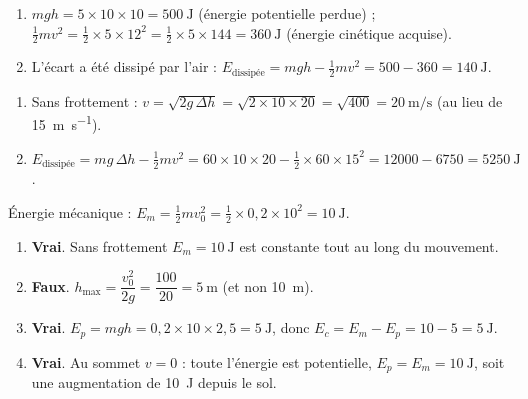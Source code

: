 \documentclass[11pt,a4paper]{article}
\begin{document}

\begin{corrige}
\begin{enumerate}[label=\alph*)]
  \item $mgh=5\times10\times10=\qty{500}{\joule}$ (énergie potentielle perdue) ;
        $\tfrac12 m v^2=\tfrac12\times5\times12^2=\tfrac12\times5\times144=\qty{360}{\joule}$
        (énergie cinétique acquise).
  \item L'écart a été dissipé par l'air :
        $E_{\text{dissipée}}=mgh-\tfrac12 m v^2=500-360=\qty{140}{\joule}$.
\end{enumerate}
\end{corrige}

\begin{corrige}
\begin{enumerate}[label=\alph*)]
  \item Sans frottement : $v=\sqrt{2g\,\Delta h}=\sqrt{2\times10\times20}=\sqrt{400}=\qty{20}{\metre\per\second}$
        (au lieu de \qty{15}{\metre\per\second}).
  \item $E_{\text{dissipée}}=mg\,\Delta h-\tfrac12 m v^2=60\times10\times20-\tfrac12\times60\times15^2
        =12000-6750=\qty{5250}{\joule}$.
\end{enumerate}
\end{corrige}

\begin{corrige}
Énergie mécanique : $E_m=\tfrac12 m v_0^2=\tfrac12\times0,2\times10^2=\qty{10}{\joule}$.
\begin{enumerate}[label=\alph*)]
  \item \textbf{Vrai}. Sans frottement $E_m=\qty{10}{\joule}$ est constante tout au long du mouvement.
  \item \textbf{Faux}. $h_{\max}=\dfrac{v_0^2}{2g}=\dfrac{100}{20}=\qty{5}{\metre}$ (et non \qty{10}{\metre}).
  \item \textbf{Vrai}. $E_p=mgh=0,2\times10\times2,5=\qty{5}{\joule}$, donc
        $E_c=E_m-E_p=10-5=\qty{5}{\joule}$.
  \item \textbf{Vrai}. Au sommet $v=0$ : toute l'énergie est potentielle, $E_p=E_m=\qty{10}{\joule}$,
        soit une augmentation de \qty{10}{\joule} depuis le sol.
\end{enumerate}
\end{corrige}
\end{document}

